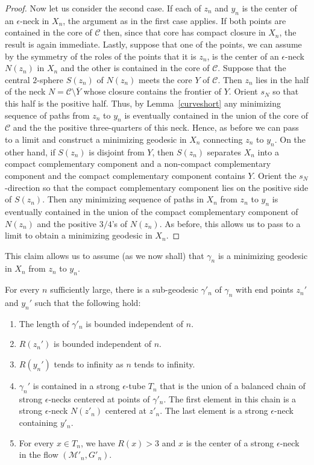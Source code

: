 \begin{proof}
Now let us consider the second case. If each of $z_n$ and $y_n$ is
the center of an $\epsilon$-neck in $X_n$, the argument as in the
first case applies. If both points are contained in the core of
${\mathcal C}$ then, since that core has compact closure in $X_n$,
the result is again immediate. Lastly, suppose that one of the
points, we can assume by the symmetry of the roles of the points
that it is $z_n$, is the center of an $\epsilon$-neck $N(z_n)$ in
$X_n$ and the other is contained in the core of ${\mathcal C}$.
Suppose that the central $2$-sphere $S(z_n)$ of $N(z_n)$  meets the
core $Y$ of ${\mathcal C}$. Then $z_n$ lies in the  half of the neck
$N={\mathcal C}\setminus \overline Y$ whose closure contains the
frontier of $Y$. Orient $s_N$ so that this half is the positive
half. Thus, by Lemma~\ref{curveshort} any minimizing sequence of
paths from $z_n$ to $y_n$ is eventually contained in the union of
the core of ${\mathcal C}$ and the the positive three-quarters of
this neck. Hence, as before we can pass to a limit and construct  a
minimizing geodesic in $X_n$ connecting $z_n$ to $y_n$. On the other
hand, if $S(z_n)$ is disjoint from $Y$, then $S(z_n)$ separates
$X_n$ into a compact complementary component and a non-compact
complementary component and the compact complementary component
contains $Y$. Orient the $s_N$-direction so that the compact
complementary component lies on the positive side of $S(z_n)$. Then
any minimizing sequence of paths in $X_n$ from $z_n$ to $y_n$ is
eventually contained in the union of the compact complementary
component of $N(z_n)$ and the positive $3/4$'s of $N(z_n)$. As
before, this allows us to pass to a limit to obtain a minimizing
geodesic in $X_n$.
\end{proof}

This claim allows us to assume (as we now shall) that $\gamma_n$ is
a minimizing geodesic in $X_n$ from $z_n$ to $y_n$.


\begin{claim}
\label{claim:balanced-chain-subgeodesic}
For every $n$ sufficiently large, there is a sub-geodesic
$\gamma'_n$ of $\gamma_n$ with end points $z_n'$ and $y_n'$ such
that the following hold:
\begin{enumerate}
\item[(1)] The length of $\gamma'_n$ is bounded independent of $n$.
\item[(2)] $R(z_n')$ is bounded independent of $n$.
\item[(3)] $R(y_n')$ tends to infinity as $n$ tends to infinity.
\item[(4)] $\gamma_n'$ is contained in a strong $\epsilon$-tube
$T_n$ that is the union of a balanced
chain of strong
$\epsilon$-necks centered at points of $\gamma'_n$. The first
element in this chain is a strong $\epsilon$-neck $N(z'_n)$ centered
at $z'_n$. The last element is a strong $\epsilon$-neck containing
$y'_n$.
\item[(5)] For every  $x\in T_n$, we have $R(x)>3$ and $x$ is the center of a strong
$\epsilon$-neck in the flow $({\mathcal M}'_n,G'_n)$.
\end{enumerate}
\end{claim}

